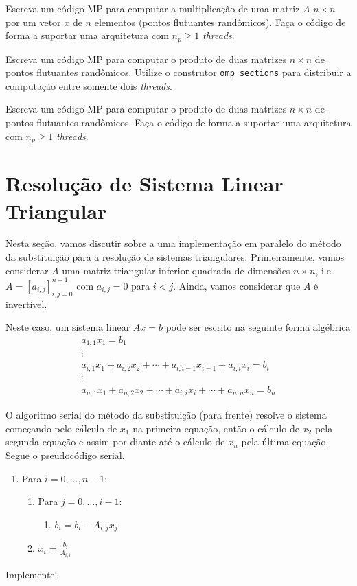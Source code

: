 \begin{exer}\label{exer:cc_Ax}
  Escreva um código MP para computar a multiplicação de uma matriz $A$ $n\times n$ por um vetor $x$ de $n$ elementos (pontos flutuantes randômicos). Faça o código de forma a suportar uma arquitetura com $n_p \geq 1$ {\it threads}. 
\end{exer}

\begin{exer}
  Escreva um código MP para computar o produto de duas matrizes $n\times n$ de pontos flutuantes randômicos. Utilize o construtor \verb+omp sections+ para distribuir a computação entre somente dois {\it threads}. 
\end{exer}

\begin{exer}
  Escreva um código MP para computar o produto de duas matrizes $n\times n$ de pontos flutuantes randômicos. Faça o código de forma a suportar uma arquitetura com $n_p \geq 1$ {\it threads}.
\end{exer}

\section{Resolução de Sistema Linear Triangular}

Nesta seção, vamos discutir sobre a uma implementação em paralelo do método da substituição para a resolução de sistemas triangulares. Primeiramente, vamos considerar $A$ uma matriz triangular inferior quadrada de dimensões $n\times n$, i.e. $A=[a_{i,j}]_{i,j=0}^{n-1}$ com $a_{i,j}=0$ para $i<j$. Ainda, vamos considerar que $A$ é invertível.

Neste caso, um sistema linear $Ax = b$ pode ser escrito na seguinte forma algébrica
\begin{gather}
  a_{1,1}x_1 = b_1\\
             \vdots \\
  a_{i,1}x_1 + a_{i,2}x_2 + \cdots + a_{i,i-1}x_{i-1} + a_{i,i}x_{i} = b_i \\
             \vdots\\
  a_{n,1}x_1 + a_{n,2}x_2 + \cdots + a_{i,i}x_i + \cdots + a_{n,n}x_{n} = b_n               
\end{gather}

O algoritmo serial do método da substituição (para frente) resolve o sistema começando pelo cálculo de $x_1$ na primeira equação, então o cálculo de $x_2$ pela segunda equação e assim por diante até o cálculo de $x_n$ pela última equação. Segue o pseudocódigo serial.
\begin{enumerate}
\item Para $i = 0, \dotsc, n-1$:
  \begin{enumerate}
  \item Para $j = 0, \dotsc, i-1$:
    \begin{enumerate}
    \item $b_i = b_i - A_{i,j}x_j$
    \end{enumerate}
  \item $\displaystyle x_i = \frac{b_i}{A_{i,i}}$
  \end{enumerate}
\end{enumerate}
Implemente!

